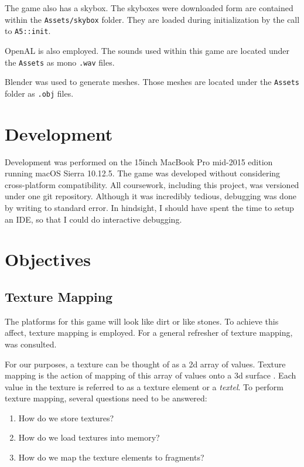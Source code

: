 \documentclass[11pt]{report}
\begin{document}
The game also has a skybox. The skyboxes were downloaded form \cite{skybox} are contained within the \verb|Assets/skybox| folder. They are loaded during initialization by the call to \verb|A5::init|.

OpenAL is also employed. The sounds used within this game are located under the \verb|Assets| as mono \verb|.wav| files.

Blender was used to generate meshes. Those meshes are located under the \verb|Assets| folder as \verb|.obj| files.

\section{Development}

Development was performed on the 15inch MacBook Pro mid-2015 edition running macOS Sierra 10.12.5. The game was developed without considering cross-platform compatibility. All coursework, including this project, was versioned under one git repository. Although it was incredibly tedious, debugging was done by writing to standard error. In hindsight, I should have spent the time to setup an IDE, so that I could do interactive debugging.

\section{Objectives}
\subsection{Texture Mapping}
The platforms for this game will look like dirt or like stones. To achieve this affect, texture mapping is employed. For a general refresher of texture mapping, \cite{texture-pixel} was consulted.

For our purposes, a texture can be thought of as a 2d array of values. Texture mapping is the action of mapping of this array of values onto a 3d surface \cite{texture-pixel}. Each value in the texture is referred to as a texture element or a \textit{textel}. To perform texture mapping, several questions need to be answered:
\begin{enumerate}
\item How do we store textures?
\item How do we load textures into memory?
\item How do we map the texture elements to fragments?
\end{enumerate}
\end{document}
